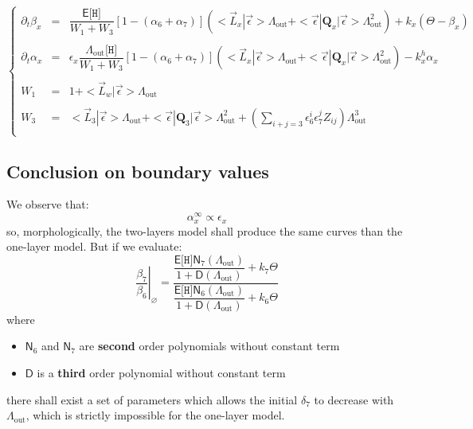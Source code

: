 \documentclass[aps,onecolumn,11pt]{revtex4}
\newcommand{\mychem}[1]{\mathtt{#1}}
\newcommand{\myconc}[1]{\big[#1\big]}
\newcommand{\spproton}{\mychem{H}}
\newcommand{\proton}{\myconc{\spproton}}
\newcommand{\myout}[1]{{#1}_{\mathrm{out}}}
\newcommand{\mymat}[1]{{\bm{#1}}}
\newcommand{\LiAll}{\Lambda}
\newcommand{\LiAllOut}{\myout{\LiAll}}
\begin{document}
\begin{equation}
\left\lbrace
\begin{array}{rcl}
	\partial_t \beta_x & = & 
	\dfrac{\mathsf{E}\proton}{W_1+W_3} \left[1-(\alpha_{6}+\alpha_{7})\right] \left( <\vec{L}_x|\vec{\epsilon}> \LiAllOut + <\vec{\epsilon}|\mymat{Q}_x|\vec{\epsilon}>\LiAllOut^2\right) 
	+ k_x \left(\Theta - \beta_x\right)\\
	\\
	\partial_t \alpha_{x} & = &  \epsilon_x  \dfrac{\LiAllOut \proton}{W_1+W_3} \left[1-(\alpha_{6}+\alpha_{7})\right] \left( <\vec{L}_x|\vec{\epsilon}> \LiAllOut + <\vec{\epsilon}|\mymat{Q}_x|\vec{\epsilon}>\LiAllOut^2\right) 
	- k_x^h \alpha_{x}
	\\
	\\
	W_1 & = & 1 +  <\vec{L}_w | \vec{\epsilon}> \LiAllOut \\
	\\
	W_3 & = & \displaystyle <\vec{L}_3|\vec{\epsilon}> \LiAllOut + <\vec{\epsilon}|\mymat{Q}_3|\vec{\epsilon}> \LiAllOut^2+ \left(\sum_{i+j=3}\epsilon_6^i \epsilon_7^j Z_{ij}\right) \LiAllOut^3 \\
\end{array}
\right.
\end{equation}

\subsection{Conclusion on boundary values}
We observe that:
\begin{equation}
\alpha_x^\infty \propto \epsilon_x
\end{equation}
so, morphologically, the two-layers model shall produce the same curves than the one-layer model.
But if we evaluate:
\begin{equation}
	\left.\dfrac{\beta_7}{\beta_6}\right\vert_\varnothing = 
	\dfrac{ \dfrac{\mathsf{E}\proton\mathsf{N}_7(\LiAllOut)}{1+\mathsf{D}(\LiAllOut)}+k_7 \Theta}
	{  \dfrac{\mathsf{E}\proton\mathsf{N}_6(\LiAllOut)}{1+\mathsf{D}(\LiAllOut)} +k_6 \Theta}
\end{equation}
where
\begin{itemize}
\item ${\mathsf{N}_6}$ and  ${\mathsf{N}_7}$ are  {\bf second} order polynomials without constant term
\item ${\mathsf{D}}$ is a {\bf third } order polynomial without constant term
\end{itemize}
there shall exist a set of parameters which allows the initial $\delta_7$ to decrease with $\LiAllOut$, which is
strictly impossible for the one-layer model.
\end{document}
